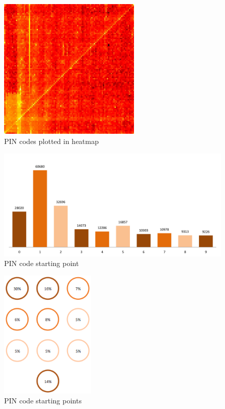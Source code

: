   \begin{figure}[H]
    \centering
    \includegraphics[width=0.6\textwidth]{pics/analysis/datagenetics.jpg}
    \caption{PIN codes plotted in heatmap \cite{datagenetics}}
    \label{fig:datagenetics}
  \end{figure}

  \begin{figure}[H]
    \centering
    \includegraphics[width=\textwidth]{pics/analysis/pinstart.png}
    \caption{PIN code starting point}
    \label{fig:pinstart}
  \end{figure}

  \begin{figure}[H]
    \centering
    \includegraphics[width=0.40\textwidth]{pics/analysis/startpointpin.png}
    \caption{PIN code starting points}
    \label{fig:pinstart2}
  \end{figure}

